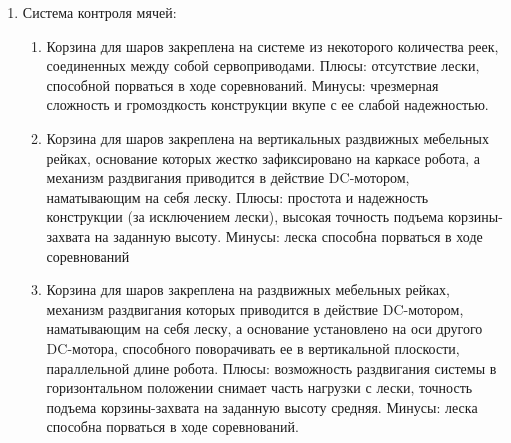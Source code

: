 \begin{enumerate}
\begin{enumerate}
\begin{enumerate}
\begin{enumerate}
	    \end{enumerate}
	    
	    \item Система контроля мячей:
	    \begin{enumerate}
	      \item Корзина для шаров закреплена на системе из некоторого количества реек, соединенных между собой сервоприводами. Плюсы: отсутствие лески, способной порваться в ходе соревнований. Минусы: чрезмерная сложность и громоздкость конструкции вкупе с ее слабой надежностью.\newline	
	      
	      \item Корзина для шаров закреплена на вертикальных раздвижных мебельных рейках, основание которых жестко зафиксировано на каркасе робота, а механизм раздвигания приводится в действие DC-мотором, наматывающим на себя леску. Плюсы: простота и надежность конструкции (за исключением лески), высокая точность подъема корзины-захвата на заданную высоту. Минусы: леска способна порваться в ходе соревнований\newline
	      
	      \item Корзина для шаров закреплена на раздвижных мебельных рейках, механизм раздвигания которых приводится в действие DC-мотором, наматывающим на себя леску, а основание установлено на оси другого DC-мотора, способного поворачивать ее в вертикальной плоскости, параллельной длине робота. Плюсы: возможность раздвигания системы в горизонтальном положении снимает часть нагрузки с лески, точность подъема корзины-захвата на заданную высоту средняя. Минусы: леска способна порваться в ходе соревнований.\newline
	      

\end{enumerate}
\end{enumerate}
\end{enumerate}
\end{enumerate}
